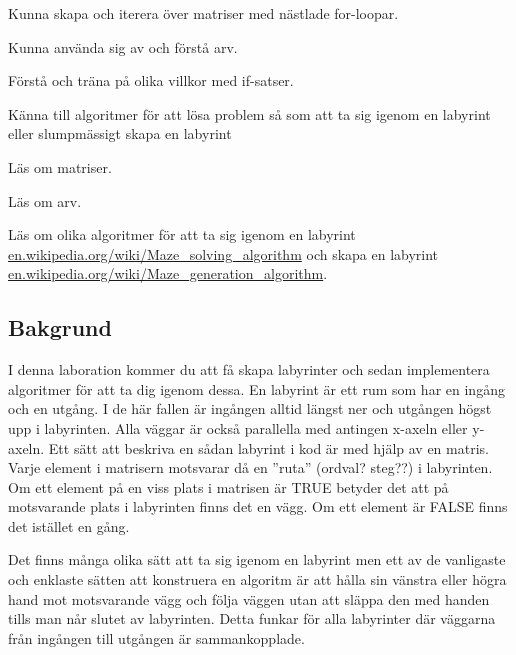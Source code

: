 

\Lab{\LabWeekNINE}

\begin{Goals}
\item Kunna skapa och iterera över matriser med nästlade for-loopar.
\item Kunna använda sig av och förstå arv.
\item Förstå och träna på olika villkor med if-satser.
\item Känna till algoritmer för att lösa problem så som att ta sig igenom en labyrint eller slumpmässigt skapa en labyrint
\end{Goals}

\begin{Preparations}
\item Läs om matriser.
\item Läs om arv.
\item Läs om olika algoritmer för att ta sig igenom en labyrint \href{https://en.wikipedia.org/wiki/Maze_solving_algorithm}{en.wikipedia.org/wiki/Maze\_solving\_algorithm} 
och skapa en labyrint 
\href{https://en.wikipedia.org/wiki/Maze_generation_algorithm}{en.wikipedia.org/wiki/Maze\_generation\_algorithm}.
\end{Preparations}

\subsection{Bakgrund}
I denna laboration kommer du att få skapa labyrinter och sedan implementera algoritmer för att ta dig igenom dessa. En labyrint är ett rum som har en ingång och en utgång. I de här fallen är ingången alltid längst ner och utgången högst upp i labyrinten. Alla väggar är också parallella med antingen x-axeln eller y-axeln. Ett sätt att beskriva en sådan labyrint i kod är med hjälp av en matris. Varje element i matrisern motsvarar då en ''ruta'' (ordval? steg??) i labyrinten. Om ett element på en viss plats i matrisen är TRUE betyder det att på motsvarande plats i labyrinten finns det en vägg. Om ett element är FALSE finns det istället en gång.

Det finns många olika sätt att ta sig igenom en labyrint men ett av de vanligaste och enklaste sätten att konstruera en algoritm är att hålla sin vänstra eller högra hand mot motsvarande vägg och följa väggen utan att släppa den med handen tills man når slutet av labyrinten. Detta funkar för alla labyrinter där väggarna från ingången till utgången är sammankopplade.

